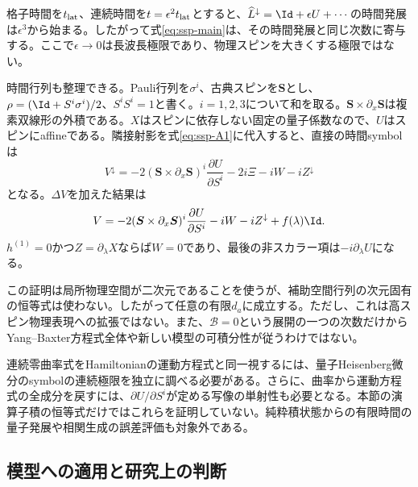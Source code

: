 格子時間を$t_{\rm lat}$、連続時間を$t=\epsilon^2t_{\rm lat}$とすると、$\widehat L^\downarrow=\Id+\epsilon U+\cdots$の時間発展は$\epsilon^3$から始まる。したがって式\eqref{eq:ssp-main}は、その時間発展と同じ次数に寄与する。ここで$\epsilon\to0$は長波長極限であり、物理スピンを大きくする極限ではない。

時間行列も整理できる。Pauli行列を$\sigma^i$、古典スピンを$\boldsymbol S$とし、$\rho=(\Id+S^i\sigma^i)/2$、$S^iS^i=1$と書く。$i=1,2,3$について和を取る。$\boldsymbol S\times\partial_x\boldsymbol S$は複素双線形の外積である。$X$はスピンに依存しない固定の量子係数なので、$U$はスピンにaffineである。隣接射影を式\eqref{eq:ssp-A1}に代入すると、直接の時間symbolは
\begin{equation}
V^\downarrow=-2(\boldsymbol S\times\partial_x\boldsymbol S)^i
\frac{\partial U}{\partial S^i}-2i\Xi-iW-iZ^\downarrow
\end{equation}
となる。$\Delta V$を加えた結果は
\begin{equation}
V=-2(\boldsymbol S\times\partial_x\boldsymbol S)^i
\frac{\partial U}{\partial S^i}-iW-iZ^\downarrow+f(\lambda)\Id.
\label{eq:ssp-V}
\end{equation}
$h^{(1)}=0$かつ$Z=\partial_\lambda X$ならば$W=0$であり、最後の非スカラー項は$-i\partial_\lambda U$になる。

この証明は局所物理空間が二次元であることを使うが、補助空間行列の次元固有の恒等式は使わない。したがって任意の有限$d_a$に成立する。ただし、これは高スピン物理表現への拡張ではない。また、$\mathcal B=0$という展開の一つの次数だけからYang--Baxter方程式全体や新しい模型の可積分性が従うわけではない。

連続零曲率式をHamiltonianの運動方程式と同一視するには、量子Heisenberg微分のsymbolの連続極限を独立に調べる必要がある。さらに、曲率から運動方程式の全成分を戻すには、$\partial U/\partial S^i$が定める写像の単射性も必要となる。本節の演算子積の恒等式だけではこれらを証明していない。純粋積状態からの有限時間の量子発展や相関生成の誤差評価も対象外である。

\subsection{模型への適用と研究上の判断}

